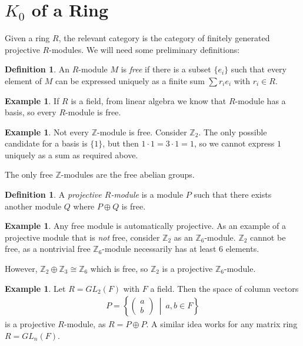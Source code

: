 \documentclass[10pt,a4paper]{article}
\theoremstyle{definition}
\newtheorem{example}[theorem]{Example}
\newtheorem{definition}[theorem]{Definition}
\begin{document}
\section{$K_0$ of a Ring}

Given a ring $R$, the relevant category is the category of finitely generated projective $R$-modules. We will need some preliminary definitions:

\begin{definition}
An $R$-module $M$ is \emph{free} if there is a subset $\{e_i\}$ such that every element of $M$ can be expressed uniquely as a finite sum $\sum r_i e_i$ with $r_i \in R$.
\end{definition}

\begin{example}
If $R$ is a field, from linear algebra we know that $R$-module has a basis, so every $R$-module is free.
\end{example}

\begin{example}
Not every $\mathbb{Z}$-module is free. Consider $\mathbb{Z}_2$. The only possible candidate for a basis is $\{1\}$, but then $1 \cdot 1 = 3 \cdot 1 = 1$, so we cannot express $1$ uniquely as a sum as required above.

The only free $\mathbb{Z}$-modules are the free abelian groups.
\end{example}

\begin{definition}
A \emph{projective $R$-module} is a module $P$ such that there exists another module $Q$ where $P \oplus Q$ is free.
\end{definition}

\begin{example}
Any free module is automatically projective. As an example of a projective module that is \emph{not} free, consider $\mathbb{Z}_2$ as an $\mathbb{Z}_6$-module. $\mathbb{Z}_2$ cannot be free, as a nontrivial free $\mathbb{Z}_6$-module necessarily has at least 6 elements.

However, $\mathbb{Z}_2 \oplus \mathbb{Z}_3 \cong \mathbb{Z}_6$ which is free, so $\mathbb{Z}_2$ is a projective $\mathbb{Z}_6$-module.
\end{example}

\begin{example}
Let $R = GL_2(F)$ with $F$ a field. Then the space of column vectors
\begin{align*}
P = \left\{ \begin{pmatrix} a \\ b \end{pmatrix} \: \middle| \:a, b \in F \right\}
\end{align*}
is a projective $R$-module, as $R = P \oplus P$. A similar idea works for any matrix ring $R = GL_n(F)$.
\end{example}
\end{document}

